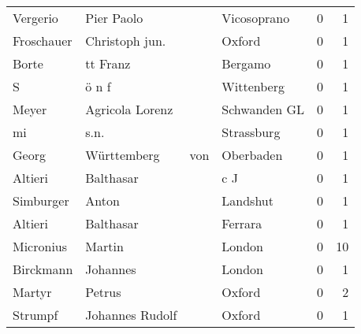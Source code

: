 \begin{tabular}{llllrr}
                 Vergerio &                         Pier Paolo &             &                                 Vicosoprano &          0 &         1 \\
               Froschauer &                     Christoph jun. &             &                                      Oxford &          0 &         1 \\
                    Borte &                           tt Franz &             &                                     Bergamo &          0 &         1 \\
                        S &                              ö n f &             &                                  Wittenberg &          0 &         1 \\
                    Meyer &                    Agricola Lorenz &             &                                Schwanden GL &          0 &         1 \\
                       mi &                               s.n. &             &                                  Strassburg &          0 &         1 \\
                    Georg &                        Württemberg &         von &                                   Oberbaden &          0 &         1 \\
                  Altieri &                          Balthasar &             &                                         c J &          0 &         1 \\
                Simburger &                              Anton &             &                                    Landshut &          0 &         1 \\
                  Altieri &                          Balthasar &             &                                     Ferrara &          0 &         1 \\
                Micronius &                             Martin &             &                                      London &          0 &        10 \\
                Birckmann &                           Johannes &             &                                      London &          0 &         1 \\
                   Martyr &                             Petrus &             &                                      Oxford &          0 &         2 \\
                  Strumpf &                    Johannes Rudolf &             &                                      Oxford &          0 &         1 \\

\end{tabular}
